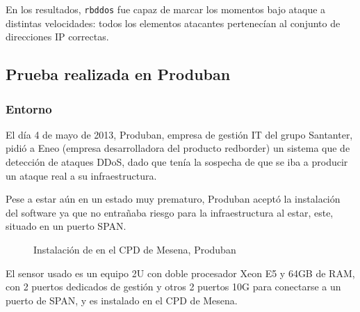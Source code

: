 En los resultados, \texttt{rbddos} fue capaz de marcar los momentos bajo ataque a distintas velocidades: todos los 
elementos atacantes pertenecían al conjunto de direcciones IP correctas.

\subsection{Prueba realizada en Produban}
\subsubsection{Entorno}
El día 4 de mayo de 2013, Produban, empresa de gestión IT del grupo Santanter, pidió a Eneo (empresa desarrolladora del  
producto redborder) un sistema que de detección de ataques \gls{DDoS}, dado que tenía la sospecha de que se iba a producir un
ataque real a su infraestructura.

Pese a estar aún en un estado muy prematuro, Produban aceptó la instalación del software ya que no entrañaba riesgo 
para la infraestructura al estar, este, situado en un puerto SPAN.

\begin{figure}[hbtp]
\centering
{}
\hfill
{}
%
\caption{Instalación de \redborderddos{} en el CPD de Mesena, Produban}
\end{figure}
%
El sensor usado es un equipo 2U con doble procesador Xeon E5 y 64GB de RAM, con 2 puertos dedicados de gestión y otros 
2 puertos 10G para conectarse a un puerto de SPAN, y es instalado en el CPD de Mesena.

